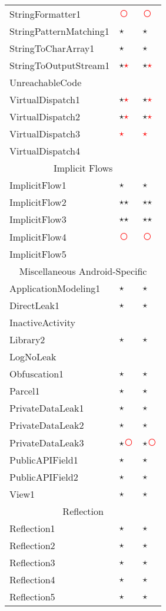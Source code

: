 \documentclass[../draft.tex]{subfiles}
\newcommand{\fp}{{\fontfamily{cmr}\selectfont\textcolor{white}{\textcircled{\textcolor{red}{$\star$}}}}}
\newcommand{\fn}{{\fontfamily{cmr}\selectfont\textcolor{red}{\textcircled{ }}}}
\newcommand{\tp}[0]{{\fontfamily{cmr}\selectfont\textcircled{$\star$}}}
\newcommand{\tsub}[1]{\multicolumn{3}{c}{#1}\\\hline}
\begin{document}
\begin{longtable}{l | l | l}
        StringFormatter1 & \fn & \fn\\
        StringPatternMatching1 & \tp & \tp\\
        StringToCharArray1 & \tp & \tp\\
        StringToOutputStream1 & \tp \fp & \tp \fp\\
        UnreachableCode & &\\
        VirtualDispatch1 & \tp \fp & \tp \fp\\
        VirtualDispatch2 & \tp \fp & \tp \fp\\
        VirtualDispatch3 & \fp & \fp\\
        VirtualDispatch4 & &\\
        \hline
        \tsub{Implicit Flows}
        ImplicitFlow1 & \tp & \tp\\
        ImplicitFlow2 & \tp \tp & \tp \tp\\
        ImplicitFlow3 & \tp \tp & \tp \tp\\
        ImplicitFlow4 & \fn & \fn\\
        ImplicitFlow5 & & \\
        \hline
        \tsub{Miscellaneous Android-Specific}
        ApplicationModeling1 & \tp & \tp\\
        DirectLeak1 & \tp & \tp\\
        InactiveActivity &  & \\
        Library2 & \tp & \tp\\
        LogNoLeak & & \\
        Obfuscation1 & \tp & \tp\\
        Parcel1 & \tp & \tp\\
        PrivateDataLeak1 & \tp & \tp\\
        PrivateDataLeak2 & \tp & \tp\\
        PrivateDataLeak3 & \tp \fn & \tp \fn\\
        PublicAPIField1 & \tp & \tp\\
        PublicAPIField2 & \tp & \tp\\
        View1 & \tp & \tp\\
        \hline
        \tsub{Reflection}
        Reflection1 & \tp & \tp\\
        Reflection2 & \tp & \tp\\
        Reflection3 & \tp & \tp\\
        Reflection4 & \tp & \tp\\
        Reflection5 & \tp & \tp\\

\end{longtable}
\end{document}

